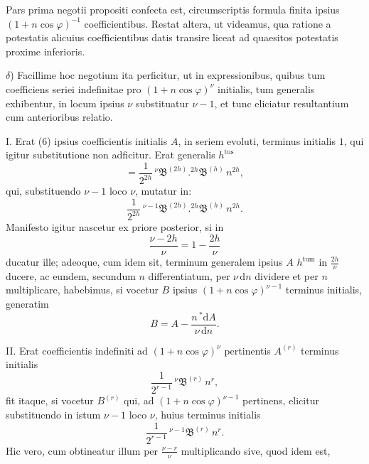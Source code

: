 Pars prima negotii propositi confecta est, circumscriptis formula finita ipsius $(1+n\cos\varphi)^{-1}$ coefficientibus. Restat altera, ut videamus, qua ratione a potestatis alicuius coefficientibus datis transire liceat ad quaesitos potestatis proxime inferioris.

$\delta$) Facillime hoc negotium ita perficitur, ut in expressionibus, quibus tum coefficiens seriei indefinitae pro $(1+n\cos\varphi)^{\nu}$ initialis, tum generalis exhibentur, in locum ipsius $\nu$ substituatur $\nu-1$, et tunc eliciatur resultantium cum anterioribus relatio.

I. Erat (6) ipsius coefficientis initialis $A$, in seriem evoluti, terminus initialis $1$, qui igitur substitutione non adficitur. Erat generalis $h^{\text{tus}}$
\[
= \frac{1}{2^{2h}}\,{}^{\nu}\mathfrak{B}^{(2h)} .  {}^{2h}\mathfrak{B}^{(h)}\,n^{2h},
\]
qui, substituendo $\nu-1$ loco $\nu$, mutatur in:
\[
\frac{1}{2^{2h}}\,{}^{\nu-1}\mathfrak{B}^{(2h)} .  {}^{2h}\mathfrak{B}^{(h)}\,n^{2h}.
\]
Manifesto igitur nascetur ex priore posterior, si in
\[
\frac{\nu-2h}{\nu} = 1-\frac{2h}{\nu}
\]
ducatur ille; adeoque, cum idem sit, terminum generalem ipsius $A$ $h^{\text{tum}}$ in $\frac{2h}{\nu}$ ducere, ac eundem, secundum $n$ differentiatum, per $\nu\,\mathrm{d}n$ dividere et per $n$ multiplicare, habebimus, si vocetur $B$ ipsius $(1+n\cos\varphi)^{\nu-1}$ terminus initialis, generatim
\[
B = A - \frac{n\,{}^{*}\!\mathrm{d}A}{\nu\,\mathrm{d}n}.
\]
\par\noindent\hspace*{\parindent}II. Erat coefficientis indefiniti ad $(1+n\cos\varphi)^{\nu}$ pertinentis $A^{(r)}$ terminus initialis
\[
\frac{1}{2^{r-1}}\,{}^{\nu}\mathfrak{B}^{(r)}\,n^{r},
\]
fit itaque, si vocetur $B^{(r)}$ qui, ad $(1+n\cos\varphi)^{\nu-1}$ pertinens, elicitur substituendo in istum $\nu-1$ loco $\nu$, huius terminus initialis
\[
\frac{1}{2^{r-1}}\,{}^{\nu-1}\mathfrak{B}^{(r)}\,n^{r}.
\]
Hic vero, cum obtineatur illum per $\frac{\nu-r}{\nu}$ multiplicando sive, quod idem est,
